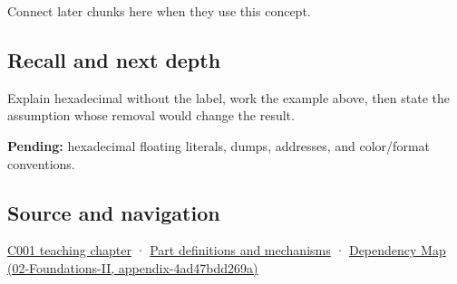 Connect later chunks here when they use this concept.

\subsection{Recall and next depth}\label{appendix-6b8075763724-recall-and-next-depth}

Explain hexadecimal without the label, work the example above, then state the assumption whose removal would change the result.

\textbf{Pending:} hexadecimal floating literals, dumps, addresses, and color/format conventions.

\subsection{Source and navigation}\label{appendix-6b8075763724-source-and-navigation}

\hyperref[01-foundations-i-ch001-from-a-signal-to-an-interpretation]{C001 teaching chapter} · \hyperref[appendix-fd090d982a15]{Part definitions and mechanisms} · \href{../02-Foundations-II/main.pdf\#nameddest=appendix-4ad47bdd269a}{Dependency Map (02-Foundations-II, appendix-4ad47bdd269a)}
